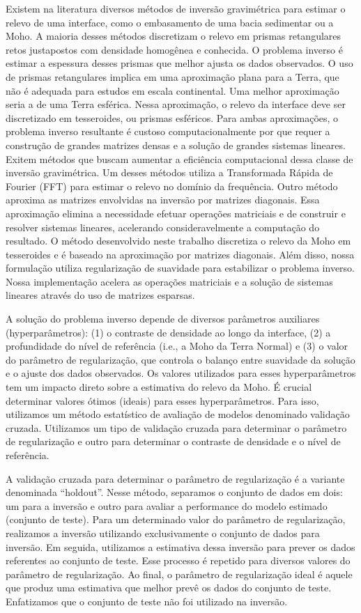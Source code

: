 \documentclass[12pt]{letter}
\begin{document}
Existem na literatura diversos métodos de inversão gravimétrica para estimar o
relevo de uma interface, como o embasamento de uma bacia sedimentar ou a Moho.
A maioria desses métodos discretizam o relevo em prismas retangulares retos
justapostos com densidade homogênea e conhecida.
O problema inverso é estimar a espessura desses prismas que melhor ajusta os
dados observados.
O uso de prismas retangulares implica em uma aproximação plana para a Terra,
que não é adequada para estudos em escala continental.
Uma melhor aproximação seria a de uma Terra esférica.
Nessa aproximação, o relevo da interface deve ser discretizado em tesseroides,
ou prismas esféricos.
Para ambas aproximações, o problema inverso resultante é custoso
computacionalmente por que requer a construção de grandes matrizes densas e a
solução de grandes sistemas lineares.
Exitem métodos que buscam aumentar a eficiência computacional dessa classe de
inversão gravimétrica.
Um desses métodos utiliza a Transformada Rápida de Fourier (FFT) para estimar o
relevo no domínio da frequência.
Outro método aproxima as matrizes envolvidas na inversão por matrizes
diagonais.
Essa aproximação elimina a necessidade efetuar operações matriciais e de
construir e resolver sistemas lineares, acelerando consideravelmente a
computação do resultado.
O método desenvolvido neste trabalho discretiza o relevo da Moho em tesseroides
e é baseado na aproximação por matrizes diagonais.
Além disso, nossa formulação utiliza regularização de suavidade para
estabilizar o problema inverso.
Nossa implementação acelera as operações matriciais e a solução de sistemas
lineares através do uso de matrizes esparsas.


A solução do problema inverso depende de diversos parâmetros auxiliares
(hyperparâmetros):
(1) o contraste de densidade ao longo da interface,
(2) a profundidade do nível de referência (i.e., a Moho da Terra Normal)
e
(3) o valor do parâmetro de regularização, que controla o balanço entre
suavidade da solução e o ajuste dos dados observados.
Os valores utilizados para esses hyperparâmetros tem um impacto direto sobre a
estimativa do relevo da Moho.
É crucial determinar valores ótimos (ideais) para esses hyperparâmetros.
Para isso, utilizamos um método estatístico de avaliação de modelos denominado
validação cruzada.
Utilizamos um tipo de validação cruzada para determinar o parâmetro de
regularização e outro para determinar o contraste de densidade e o nível de
referência.

A validação cruzada para determinar o parâmetro de regularização é a variante
denominada ``holdout''.
Nesse método, separamos o conjunto de dados em dois: um para a inversão e outro
para avaliar a performance do modelo estimado (conjunto de teste).
Para um determinado valor do parâmetro de regularização,
realizamos a inversão utilizando exclusivamente o conjunto de dados para inversão.
Em seguida, utilizamos a estimativa dessa inversão para prever os dados
referentes ao conjunto de teste.
Esse processo é repetido para diversos valores do parâmetro de regularização.
Ao final, o parâmetro de regularização ideal é aquele que produz uma estimativa
que melhor prevê os dados do conjunto de teste.
Enfatizamos que o conjunto de teste não foi utilizado na inversão.
\end{document}
